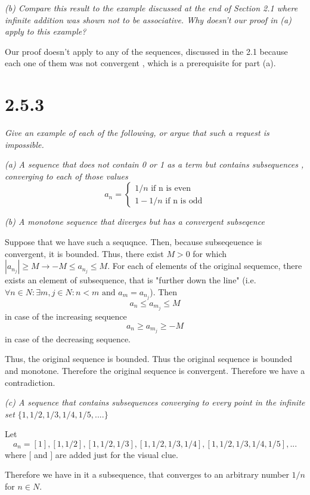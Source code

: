 \documentclass[11pt,oneside,titlepage]{book}
\begin{document}
\textit{(b) Compare this result to the example discussed at the end of Section
  2.1 where infinite addition was shown not to be associative. Why doesn't
  our proof in (a) apply to this example?}

Our proof doesn't apply to any of the sequences, discussed in the 2.1
because each one  of them was not convergent , which is a
prerequisite for part (a).

\section*{2.5.3}
\textit{Give an example of each of the following, or argue that such a request
  is impossible.}

\textit{(a) A sequence that does not contain 0 or 1 as a term but contains
  subsequences , converging to each of those values}
\begin{equation}
  a_n =
  \begin{cases}
    1/n \text{ if n is even} \\
    1 - 1/n \text{ if n is odd}
  \end{cases}
\end{equation}

\textit{(b) A monotone sequence that diverges but has a convergent subseqence}

Suppose that we have such a sequqnce. Then, because  subseqeuence is
convergent, it is bounded. Thus, there exist $M > 0$ for which
$ |a_{n_j}| \geq M \to -M \leq a_{n_j} \leq M$. For each of elements
of the original sequemce, there exists an element of subsequence,
that is "further down the line" (i.e.
$\forall n \in N: \exists m, j \in N: n < m \text{ and } a_m =
a_{n_j}$). Then
$$a_n \leq a_{m_j} \leq M$$
in case of the increasing sequence
$$a_n \geq a_{m_j} \geq -M$$
in case of the decreasing sequence.

Thus, the original sequence is bounded. Thus the original sequence is bounded
and monotone. Therefore the original sequence is convergent. Therefore
we have a contradiction.

\textit{(c) A sequence that contains subsequences converging to every point
  in the infinite set $\{1, 1/2, 1/3, 1/4, 1/5, ....\}$}

Let
$$a_n = [1], [1, 1/2], [1, 1/2, 1/3], [1, 1/2, 1/3, 1/4], [1, 1/2, 1/3, 1/4, 1/5], ...$$
where $[$ and $]$ are added just for the visual clue.

Therefore we have in it a subsequence, that converges to an arbitrary number
$1/n$ for $n \in N$.
\end{document}
